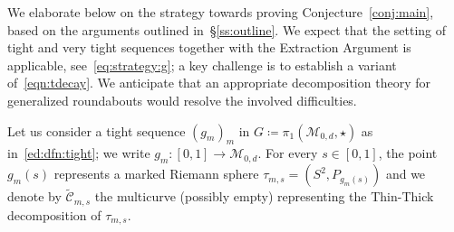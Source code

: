 \documentclass{amsart}
\theoremstyle{definition}
\theoremstyle{remark}
\begin{document}
We elaborate below on the strategy towards proving Conjecture~\ref{conj:main}, based on the arguments outlined in~\S\ref{ss:outline}. We expect that the setting of tight and very tight sequences together with the Extraction Argument is applicable, see~\eqref{eq:strategy:g}; a key challenge is to establish a variant of~\eqref{eqn:tdecay}. We anticipate that an appropriate decomposition theory for generalized roundabouts would resolve the involved difficulties.

Let us consider a tight sequence $(g_m)_m$ in $G\coloneqq  \pi_1(\mathscr M_{0,d}, \star)$ as in~\eqref{ed:dfn:tight}; we write $g_{m}\colon [0,1]\to \mathscr M_{0,d}$. For every $s\in[0,1]$, the point $g_{m}(s)$ represents a marked Riemann sphere $\tau_{m,s}=(S^2,P_{g_m(s)})$ and we denote by  $\widetilde{\mathscr C}_{m,s}$ the multicurve (possibly empty) representing the Thin-Thick decomposition of $\tau_{m,s}$.
\end{document}
